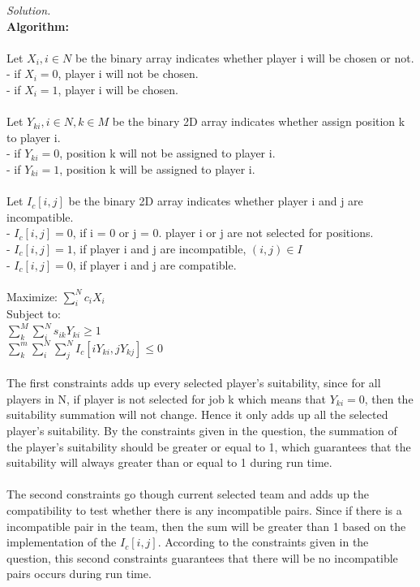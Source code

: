 \documentclass[10pt]{article}
\begin{document}
\begin{mdframed}
    \textit{Solution.}\\
    \textbf{Algorithm:}\\
    \\Let $X_i, i \in N$ be the binary array indicates whether player i will be chosen or not.
    \\- if $X_i = 0$, player i will not be chosen.
    \\- if $X_i = 1$, player i will be chosen.
    \\
    \\Let $Y_{ki}, i \in N, k \in M$ be the binary 2D array indicates whether assign position k to player i.
    \\- if $Y_{ki} = 0$, position k will not be assigned to player i.
    \\- if $Y_{ki} = 1$, position k will be assigned to player i.
    \\
    \\Let $I_c[i,j]$ be the binary 2D array indicates whether player i and j are incompatible.
    \\- $I_c[i,j] = 0$, if i = 0 or j = 0. player i or j are not selected for positions.
    \\- $I_c[i,j] = 1$, if player i and j are incompatible, $(i,j) \in I$ 
    \\- $I_c[i,j] = 0$, if player i and j are compatible.
    \\
    \\Maximize: $\sum_{i}^N c_i X_i$
    \\Subject to:
    \\ $\sum_k^M\sum_i^N s_{ik}Y_{ki} \geq 1$
    \\ $\sum_k^m\sum_i^N\sum_j^N I_c[iY_{ki}, jY_{kj}] \leq 0$
    \\
    \\ The first constraints adds up every selected player's suitability, since for all players in N, if player is not selected for job k which means that $Y_{ki} = 0$, then the suitability summation will not change. Hence it only adds up all the selected player's suitability. By the constraints given in the question, the summation of the player's suitability should be greater or equal to 1, which guarantees that the suitability will always greater than or equal to 1 during run time.
    \\
    \\ The second constraints go though current selected team and adds up the compatibility to test whether there is any incompatible pairs. Since if there is a incompatible pair in the team, then the sum will be greater than 1 based on the implementation of the $I_c[i,j]$. According to the constraints given in the question, this second constraints guarantees that there will be no incompatible pairs occurs during run time.\\

\end{mdframed}
\end{document}
